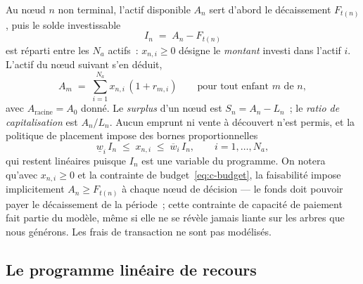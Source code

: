 \documentclass[11pt,letterpaper]{article}
\theoremstyle{definition}
\begin{document}
Au n\oe ud $n$ non terminal, l'actif disponible $A_n$ sert d'abord le décaissement
$F_{t(n)}$, puis le solde investissable
\begin{equation}\label{eq:investissable}
I_n \;=\; A_n - F_{t(n)}
\end{equation}
est réparti entre les $N_a$ actifs~: $x_{n,i} \ge 0$ désigne le \emph{montant}
investi dans l'actif $i$. L'actif du n\oe ud suivant s'en déduit,
\begin{equation}\label{eq:propagation}
A_m \;=\; \sum_{i=1}^{N_a} x_{n,i}\,(1 + r_{m,i})
\qquad \text{pour tout enfant } m \text{ de } n,
\end{equation}
avec $A_{\text{racine}} = A_0$ donné. Le \emph{surplus} d'un n\oe ud est
$S_n = A_n - L_n$~; le \emph{ratio de capitalisation} est $A_n / L_n$. Aucun
emprunt ni vente à découvert n'est permis, et la politique de placement impose des
bornes proportionnelles
\begin{equation}\label{eq:bornes}
\underline w_i\, I_n \;\le\; x_{n,i} \;\le\; \overline w_i\, I_n,
\qquad i = 1, \dots, N_a,
\end{equation}
qui restent linéaires puisque $I_n$ est une variable du programme. On notera
qu'avec $x_{n,i} \ge 0$ et la contrainte de
budget~\eqref{eq:c-budget}, la faisabilité impose implicitement
$A_n \ge F_{t(n)}$ à chaque n\oe ud de décision --- le fonds doit pouvoir payer
le décaissement de la période~; cette contrainte de capacité de paiement fait
partie du modèle, même si elle ne se révèle jamais liante sur les arbres que
nous générons. Les frais de
transaction ne sont pas modélisés.

\subsection{Le programme linéaire de recours}\label{ssec:lp}
\end{document}
